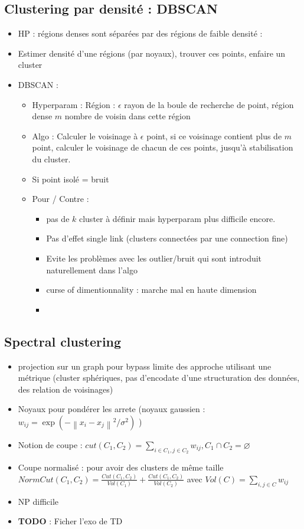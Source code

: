\documentclass{article}
\theoremstyle{plain}%
\theoremstyle{definition}
\theoremstyle{remark}
\begin{document}
\subsection{Clustering par densité : DBSCAN}
\begin{itemize}
    \item HP : régions denses sont séparées par des régions de faible densité : 
    \item Estimer densité d'une régions (par noyaux), trouver ces points, enfaire un cluster
    \item DBSCAN : \begin{itemize}
        \item Hyperparam : Région : $ \epsilon  $ rayon de la boule de recherche de point, région dense $ m $  nombre de voisin dans cette région
        \item Algo : Calculer le voisinage à $ \epsilon  $ point, si ce voisinage contient plus de $ m $ point, calculer le voisinage de chacun de ces points, jusqu'à stabilisation du cluster.
        \item Si point isolé = bruit
        \item Pour / Contre : \begin{itemize}
            \item pas de $ k $ cluster à définir mais hyperparam plus difficile encore. 
            \item Pas d'effet single link (clusters connectées par une connection fine)
            \item Evite les problèmes avec les outlier/bruit qui sont introduit naturellement dans l'algo
            \item curse of dimentionnality : marche mal en haute dimension
            \item 
        \end{itemize}
    \end{itemize}
\end{itemize}

\subsection{Spectral clustering}
\begin{itemize}
    \item projection sur un graph pour bypass limite des approche utilisant une métrique (cluster sphériques, pas d'encodate d'une structuration des données, des relation de voisinages) 
    \item Noyaux pour pondérer les arrete (noyaux gaussien : $ w_{ij} = \exp (- \left\| x_i - x_j \right\|^2 / \sigma ^2 ) $ )
    \item Notion de coupe : $ cut(C_1, C_2) = \sum_{i \in C_1, j \in C_2} w_{ij}, C_1 \cap C_2 = \varnothing $ 
    \item Coupe normalisé : pour avoir des clusters de même taille $ NormCut(C_1, C_2) = \frac{Cut(C_1, C_2)}{Vol(C_1)} + \frac{Cut(C_1, C_2)}{Vol(C_2)} $ avec $ Vol(C) = \sum_{i, j \in C} w_{ij}$  
    \item NP difficile
    \item \textbf{TODO} : Ficher l'exo de TD
\end{itemize}
\end{document}
